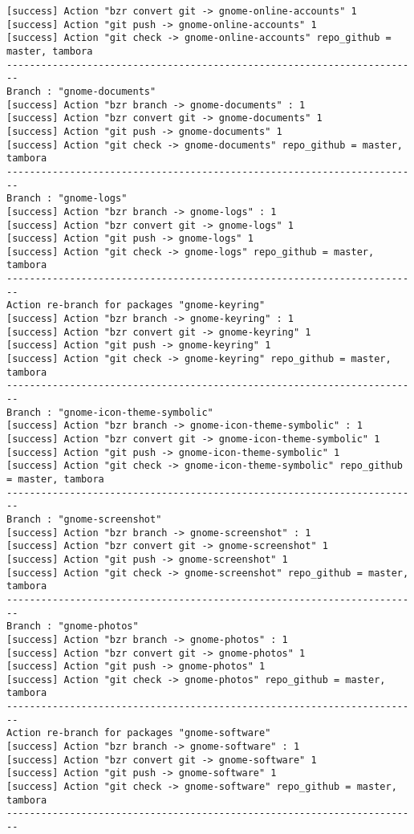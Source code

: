 {\begin{lstlisting}[language=ShellBash2]
[success] Action "bzr convert git -> gnome-online-accounts" 1
[success] Action "git push -> gnome-online-accounts" 1
[success] Action "git check -> gnome-online-accounts" repo_github = master, tambora
------------------------------------------------------------------------
Branch : "gnome-documents"
[success] Action "bzr branch -> gnome-documents" : 1
[success] Action "bzr convert git -> gnome-documents" 1
[success] Action "git push -> gnome-documents" 1
[success] Action "git check -> gnome-documents" repo_github = master, tambora
------------------------------------------------------------------------
Branch : "gnome-logs"
[success] Action "bzr branch -> gnome-logs" : 1
[success] Action "bzr convert git -> gnome-logs" 1
[success] Action "git push -> gnome-logs" 1
[success] Action "git check -> gnome-logs" repo_github = master, tambora
------------------------------------------------------------------------
Action re-branch for packages "gnome-keyring" 
[success] Action "bzr branch -> gnome-keyring" : 1
[success] Action "bzr convert git -> gnome-keyring" 1
[success] Action "git push -> gnome-keyring" 1
[success] Action "git check -> gnome-keyring" repo_github = master, tambora
------------------------------------------------------------------------
Branch : "gnome-icon-theme-symbolic"
[success] Action "bzr branch -> gnome-icon-theme-symbolic" : 1
[success] Action "bzr convert git -> gnome-icon-theme-symbolic" 1
[success] Action "git push -> gnome-icon-theme-symbolic" 1
[success] Action "git check -> gnome-icon-theme-symbolic" repo_github = master, tambora
------------------------------------------------------------------------
Branch : "gnome-screenshot"
[success] Action "bzr branch -> gnome-screenshot" : 1
[success] Action "bzr convert git -> gnome-screenshot" 1
[success] Action "git push -> gnome-screenshot" 1
[success] Action "git check -> gnome-screenshot" repo_github = master, tambora
------------------------------------------------------------------------
Branch : "gnome-photos"
[success] Action "bzr branch -> gnome-photos" : 1
[success] Action "bzr convert git -> gnome-photos" 1
[success] Action "git push -> gnome-photos" 1
[success] Action "git check -> gnome-photos" repo_github = master, tambora
------------------------------------------------------------------------
Action re-branch for packages "gnome-software" 
[success] Action "bzr branch -> gnome-software" : 1
[success] Action "bzr convert git -> gnome-software" 1
[success] Action "git push -> gnome-software" 1
[success] Action "git check -> gnome-software" repo_github = master, tambora
------------------------------------------------------------------------

\end{lstlisting}}
